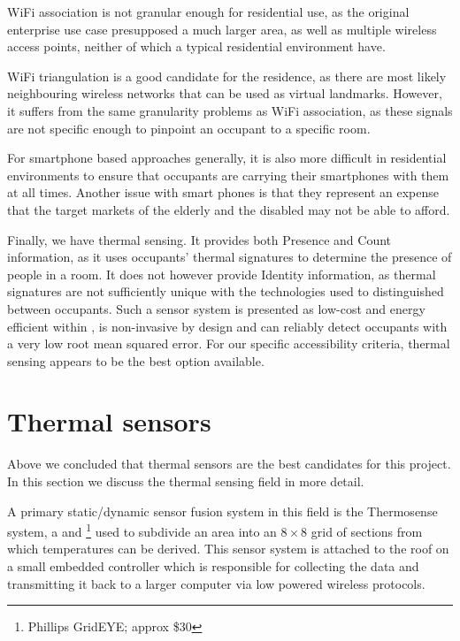 \documentclass[../thesis/thesis.tex]{subfiles}
\begin{document}
WiFi association is not granular enough for residential use, as the original enterprise use case presupposed a much larger area, as well as multiple wireless access points, neither of which a typical residential environment have.

WiFi triangulation is a good candidate for the residence, as there are most likely neighbouring wireless networks that can be used as virtual landmarks. However, it suffers from the same granularity problems as WiFi association, as these signals are not specific enough to pinpoint an occupant to a specific room.

For smartphone based approaches generally, it is also more difficult in residential environments to ensure that occupants are carrying their smartphones with them at all times.  Another issue with smart phones is that they represent an expense that the target markets of the elderly and the disabled may not be able to afford.

Finally, we have thermal sensing. It provides both Presence and Count information, as it uses occupants' thermal signatures to determine the presence of people in a room. It does not however provide Identity information, as thermal signatures are not sufficiently unique with the technologies used to distinguished between occupants. Such a sensor system is presented as low-cost and energy efficient within \cite{beltran2013thermosense}, is non-invasive by design and can reliably detect occupants with a very low root mean squared error. For our specific accessibility criteria, thermal sensing appears to be the best option available.

\section{Thermal sensors}
\label{sec:litreview:thermalsensors}
Above we concluded that thermal sensors are the best candidates for this project. In this section we discuss the thermal sensing field in more detail.

A primary static/dynamic sensor fusion system in this field is the Thermosense system, \cite{beltran2013thermosense} a \pir and \iar\footnote{Phillips GridEYE; approx \$30} used to subdivide an area into an $8\times8$ grid of sections from which temperatures can be derived. This sensor system is attached to the roof on a small embedded controller which is responsible for collecting the data and transmitting it back to a larger computer via low powered wireless protocols.
\end{document}
